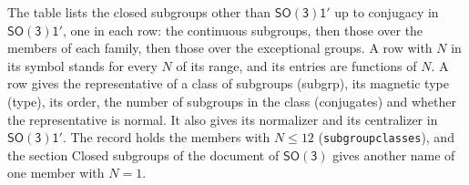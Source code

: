\documentclass[10pt,a4paper]{article}
\numberwithin{equation}{section}
\newcommand{\grp}[1]{\mathsf{#1}}
\begin{document}
The table lists the closed subgroups other than $\grp{SO(3)1'}$ up to conjugacy in $\grp{SO(3)1'}$, one in each row: the continuous subgroups, then those over the members of each family, then those over the exceptional groups. \label{n:index.family.N}A row with $N$ in its symbol stands for every $N$ of its range, and its entries are functions of $N$. \label{n:head.subgroup}\label{n:head.magnetic.type}\label{n:head.order}\label{n:head.conjugates}\label{n:head.normal}A row gives the representative of a class of subgroups (subgrp), its magnetic type (type), its order, the number of subgroups in the class (conjugates) and whether the representative is normal. \label{n:head.normalizer}\label{n:head.centralizer}It also gives its normalizer and its centralizer in $\grp{SO(3)1'}$. The record holds the members with $N \le 12$ (\texttt{subgroupclasses}), and the section Closed subgroups of the document of \href{../../../rotation/data/pdf/SO3.pdf}{$\grp{SO(3)}$} gives another name of one member with $N = 1$.
\end{document}
